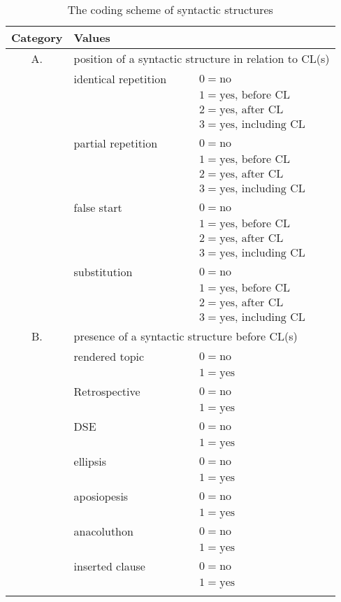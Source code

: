 \begin{table}
\caption{The coding scheme of syntactic structures\label{T9.2b}}
\begin{tabular}{cll}
\lsptoprule
Category & Values \\\midrule
A. & \multicolumn{2}{l}{position of a syntactic structure in relation to CL(s)} \\
& identical repetition & $0 = \text{no}$ \\
&& $1 = \text{yes, before CL}$ \\
&& $2 = \text{yes, after CL}$ \\
&& $3 = \text{yes, including CL}$ \\
& partial repetition & $0 = \text{no}$ \\
&& $1 = \text{yes, before CL}$ \\
&& $2 = \text{yes, after CL}$ \\
&& $3 = \text{yes, including CL}$ \\
& false start & $0 = \text{no}$ \\
&& $1 = \text{yes, before CL}$ \\
&& $2 = \text{yes, after CL}$ \\
&& $3 = \text{yes, including CL}$ \\
& substitution & $0 = \text{no}$ \\
&& $1 = \text{yes, before CL}$ \\
&& $2 = \text{yes, after CL}$ \\
&& $3 = \text{yes, including CL}$ \\
B.&\multicolumn{2}{l}{presence of a syntactic structure before CL(s)}\\
& rendered topic & $0 = \text{no}$ \\
&& $1 = \text{yes}$ \\
& Retrospective&$0 = \text{no}$ \\
&& $1 = \text{yes}$ \\
& DSE & $0 = \text{no}$ \\
&& $1 = \text{yes}$ \\
& ellipsis & $0 = \text{no}$ \\
&& $1 = \text{yes}$ \\
& aposiopesis & $0 = \text{no}$ \\
&& $1 = \text{yes}$ \\
& anacoluthon & $0 = \text{no}$ \\
&& $1 = \text{yes}$ \\
& inserted clause & $0 = \text{no}$ \\
&& $1 = \text{yes}$ \\
\lspbottomrule
\end{tabular}
\end{table}


